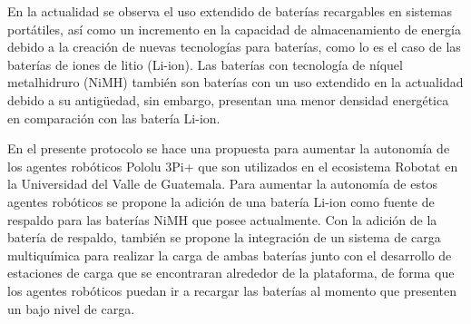 En la actualidad se observa el uso extendido de baterías recargables
en sistemas portátiles, así como un incremento en la capacidad de almacenamiento
de energía debido a la creación de nuevas tecnologías para baterías, como lo es 
el caso de las baterías de iones de litio (Li-ion). Las baterías con tecnología 
de níquel metalhidruro (NiMH) también son baterías con un uso extendido en la 
actualidad debido a su antigüedad, sin embargo, presentan una menor densidad energética
en comparación con las batería Li-ion.

En el presente protocolo se hace una propuesta para aumentar la autonomía
de los agentes robóticos Pololu 3Pi+ que son utilizados en el ecosistema Robotat
en la Universidad del Valle de Guatemala. Para aumentar la autonomía de estos 
agentes robóticos se propone la adición de una batería Li-ion como fuente de respaldo
para las baterías NiMH que posee actualmente. Con la adición de la batería de respaldo,
también se propone la integración de un sistema de carga multiquímica para realizar la carga
de ambas baterías junto con el desarrollo de estaciones de carga que se encontraran alrededor 
de la plataforma, de forma que los agentes robóticos puedan ir a recargar las baterías al
momento que presenten un bajo nivel de carga.